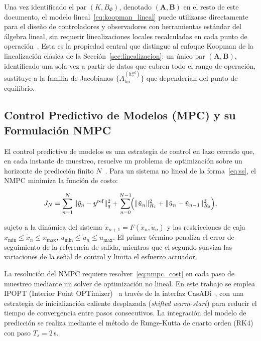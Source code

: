 \documentclass[12pt,letterpaper]{article}
\begin{document}
Una vez identificado el par $(K, B_\Phi)$, denotado $(\mathbf{A}, \mathbf{B})$ en el
resto de este documento, el modelo lineal~\eqref{eq:koopman_lineal} puede
utilizarse directamente para el diseño de controladores y observadores con
herramientas estándar del álgebra lineal, sin requerir linealizaciones locales
recalculadas en cada punto de operación~\cite{korda2018}. Esta es la propiedad
central que distingue al enfoque Koopman de la linealización clásica de la
Sección~\ref{sec:linealizacion}: un único par $(\mathbf{A},\mathbf{B})$, identificado
una sola vez a partir de datos que cubren todo el rango de operación, sustituye a la
familia de Jacobianos $\{A_{\mathrm{lin}}^{(h_2^{\mathrm{ref}})}\}$ que dependerían
del punto de equilibrio.


\subsection{Control Predictivo de Modelos (MPC) y su Formulación NMPC}
\label{sec:mpc_nmpc}

El control predictivo de modelos es una estrategia de control en lazo cerrado
que, en cada instante de muestreo, resuelve un problema de optimización sobre un
horizonte de predicción finito $N$~\cite{rawlings2009}. Para un sistema no lineal de
la forma~\eqref{eq:ss}, el NMPC minimiza la función de costo:

\begin{equation}
J_N = \sum_{n=1}^{N}\|\tilde{y}_n - y^{\mathrm{ref}}\|_q^2
+ \sum_{n=0}^{N-1}\!\Bigl(\|\tilde{u}_n\|_{R_1}^2 + \|\tilde{u}_n - \tilde{u}_{n-1}\|_{R_2}^2\Bigr),
\label{eq:nmpc_cost}
\end{equation}

sujeto a la dinámica del sistema $\tilde{x}_{n+1} = F(\tilde{x}_n, \tilde{u}_n)$ y las
restricciones de caja $x_{\min} \leq \tilde{x}_n \leq x_{\max}$,
$u_{\min} \leq \tilde{u}_n \leq u_{\max}$. El primer término penaliza el error de
seguimiento de la referencia de salida, mientras que el segundo suaviza las
variaciones de la señal de control y limita el esfuerzo actuador.

La resolución del NMPC requiere resolver~\eqref{eq:nmpc_cost} en cada paso de
muestreo mediante un solver de optimización no lineal. En este trabajo se emplea
IPOPT (Interior Point OPTimizer)~\cite{wachter2006} a través de la interfaz
CasADi~\cite{andersson2019}, con una estrategia de inicialización caliente
desplazada (\textit{shifted warm-start}) para reducir el tiempo de convergencia entre
pasos consecutivos. La integración del modelo de predicción se realiza mediante el
método de Runge-Kutta de cuarto orden (RK4) con paso $T_s = 2$\,s.
\end{document}

